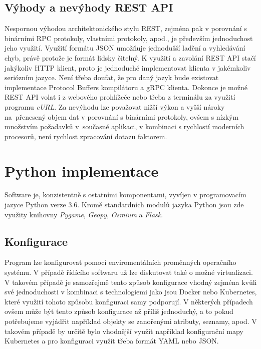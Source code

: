\documentclass[czech, bachelor]{diploma}
\begin{document}
\subsection{Výhody a nevýhody REST API}

Nespornou výhodou architektonického stylu REST\cite{rest-source}, zejména pak v porovnání s binárními RPC
protokoly\cite{grpc-source}, vlastními protokoly, apod., je především jednoduchost jeho využití. Využití formátu
JSON\cite{json-source} umožňuje jednodušší ladění a vyhledávání chyb, právě protože je formát lidsky čitelný. K využití a zavolání
REST API stačí jakýkoliv HTTP\cite{http-source} klient, proto je jednoduché implementovat klienta v jakémkoliv seriózním jazyce.
Není třeba doufat, že pro daný jazyk bude existovat implementace Protocol Buffers\cite{protobuf-source} kompilátoru a
gRPC\cite{grpc-source} klienta. Dokonce je možné REST API volat i z webového prohlížeče nebo třeba z terminálu za využití programu
\emph{cURL}\cite{curl-source}. Za nevýhodu lze považovat nižší výkon a vyšší nároky na~přenesený objem dat v porovnání s binárními
protokoly, ovšem s nízkým množstvím požadavků v~současné aplikaci, v kombinaci s rychlostí moderních procesorů, není rychlost
zpracování dotazu faktorem.

\section{Python implementace}

Software je, konzistentně s ostatními komponentami, vyvíjen v programovacím jazyce Python verze 3.6. Kromě standardních modulů
jazyka Python jsou zde využity knihovny \emph{Pygame}\cite{pygame-source}, \emph{Geopy}\cite{geopy-source}, \emph{Osmium}\cite{
osmium-source} a \emph{Flask}\cite{flask-source}.

\subsection{Konfigurace}

Program lze konfigurovat pomocí enviromentálních proměnných operačního systému. V případě řídícího softwaru už lze diskutovat také
o možné virtualizaci. V takovém případě je samozřejmě tento způsob konfigurace vhodný zejména kvůli své jednoduchosti v kombinaci
s technologiemi jako jsou Docker nebo Kubernetes\cite{virtualization-source}, které využití tohoto způsobu konfiguraci samy
podporují. V některých případech ovšem může být tento způsob konfigurace až příliš jednoduchý, a to pokud potřebujeme vyjádřit
například objekty se zanořenými atributy, seznamy, apod. V takovém případě by určitě bylo vhodnější využít například konfigurační
mapy Kubernetes a pro konfiguraci využít třeba formát YAML\cite{yaml-source} nebo JSON\cite{json-source}.
\end{document}
